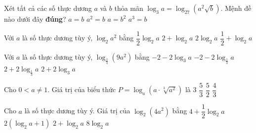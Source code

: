 \begin{ex}%
	Xét tất cả các số thực dương $a$ và $b$ thỏa mãn $\log_3 a=\log_{27}\left(a^2\sqrt{b}\right)$. Mệnh đề nào dưới đây \textbf{đúng}?
	\choice 
	{ $a=b$}
	{ \True $a^2=b$}
	{ $a=b^2$}
	{ ${{a}^3}=b$
	}
	 \end{ex}


\begin{ex}%
	Với $a$ là số thực dương tùy ý, $\log_2 a^2$ bằng
	\choice 
	{ $\dfrac{1}{2}\log_2 a$}
	{ $2+\log_2 a$}
	{ \True $2\log_2 a$}
	{ $\dfrac{1}{2}+\log_2 a$}
\end{ex}



\begin{ex}%
	Với $a$ là số thực dương tùy ý, $\log_{\tfrac{1}{3}}(9a^2)$ bằng
	\choice 
	{ \True $-2-2\log_3 a$}
	{ $-2-2\log_{\tfrac{1}{3}} a$} 
	{ $2+2\log_{\tfrac{1}{3}} a$}
	{ $2+2\log_3 a$}
\end{ex}



\begin{ex}%
	Cho $0<a\ne 1$. Giá trị của biểu thức $P=\log_a\left(a\cdot \sqrt[3]{a^2}\right)$ là
	\choice 
	{ $3$}
	{\True $\dfrac{5}{3}$}
	{ $\dfrac{5}{2}$}
	{ $\dfrac{4}{3}$}
\end{ex}



\begin{ex}%
	Cho $a$ là số thực dương tùy ý. Giá trị của $\log_2(4a^2)$ bằng
	\choice 
	{ $4+\dfrac{1}{2}\log_2 a$}
	{\True $2( \log_2 a+1 )$}
	{ $2+\log_2 a$}
	{ $8\log_2 a$}
\end{ex}




